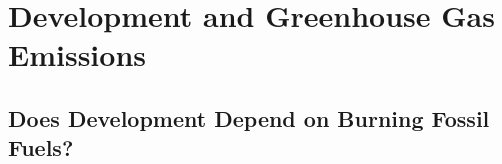 \chapter{Development and Greenhouse Gas Emissions}

\section{Does Development Depend on Burning Fossil Fuels?}